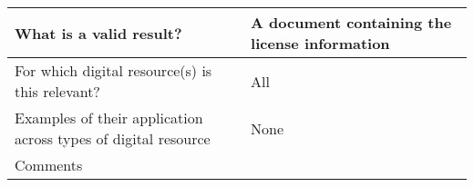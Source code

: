 \documentclass[english]{article}
\begin{document}
\begin{longtable}{|p{5cm}|p{9cm}|}
\\



\hline
What is a valid result? &  


A document containing the license information

\\



\hline
For which digital resource(s) is this relevant? &  All\\



\hline
Examples of their application across types of digital resource &  None

\\



\hline

Comments & 


\\
\hline

\end{longtable}


\newpage
\end{document}
